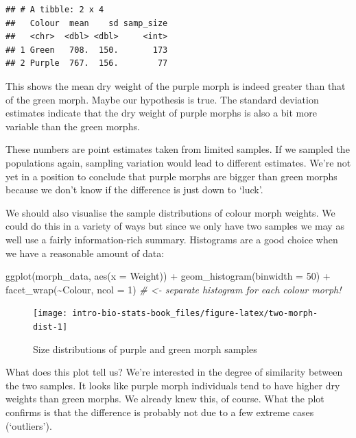 \documentclass[
]{book}
\newenvironment{Shaded}{\begin{snugshade}}{\end{snugshade}}
\newcommand{\AttributeTok}[1]{\textcolor[rgb]{0.77,0.63,0.00}{#1}}
\newcommand{\CommentTok}[1]{\textcolor[rgb]{0.56,0.35,0.01}{\textit{#1}}}
\newcommand{\DecValTok}[1]{\textcolor[rgb]{0.00,0.00,0.81}{#1}}
\newcommand{\FunctionTok}[1]{\textcolor[rgb]{0.00,0.00,0.00}{#1}}
\newcommand{\NormalTok}[1]{#1}
\newcommand{\SpecialCharTok}[1]{\textcolor[rgb]{0.00,0.00,0.00}{#1}}
\begin{document}
\begin{verbatim}
## # A tibble: 2 x 4
##   Colour  mean    sd samp_size
##   <chr>  <dbl> <dbl>     <int>
## 1 Green   708.  150.       173
## 2 Purple  767.  156.        77
\end{verbatim}

This shows the mean dry weight of the purple morph is indeed greater than that of the green morph. Maybe our hypothesis is true. The standard deviation estimates indicate that the dry weight of purple morphs is also a bit more variable than the green morphs.

These numbers are point estimates taken from limited samples. If we sampled the populations again, sampling variation would lead to different estimates. We're not yet in a position to conclude that purple morphs are bigger than green morphs because we don't know if the difference is just down to `luck'.

We should also visualise the sample distributions of colour morph weights. We could do this in a variety of ways but since we only have two samples we may as well use a fairly information-rich summary. Histograms are a good choice when we have a reasonable amount of data:

\begin{Shaded}
\begin{Highlighting}[]
\FunctionTok{ggplot}\NormalTok{(morph\_data, }\FunctionTok{aes}\NormalTok{(}\AttributeTok{x =}\NormalTok{ Weight)) }\SpecialCharTok{+} 
  \FunctionTok{geom\_histogram}\NormalTok{(}\AttributeTok{binwidth =} \DecValTok{50}\NormalTok{) }\SpecialCharTok{+} 
  \FunctionTok{facet\_wrap}\NormalTok{(}\SpecialCharTok{\textasciitilde{}}\NormalTok{Colour, }\AttributeTok{ncol =} \DecValTok{1}\NormalTok{) }\CommentTok{\# \textless{}{-} separate histogram for each colour morph!}
\end{Highlighting}
\end{Shaded}

\begin{figure}

{\centering \texttt{[image: intro-bio-stats-book\_files/figure-latex/two-morph-dist-1]} 

}

\caption{Size distributions of purple and green morph samples}\label{fig:two-morph-dist}
\end{figure}

What does this plot tell us? We're interested in the degree of similarity between the two samples. It looks like purple morph individuals tend to have higher dry weights than green morphs. We already knew this, of course. What the plot confirms is that the difference is probably not due to a few extreme cases (`outliers').
\end{document}
